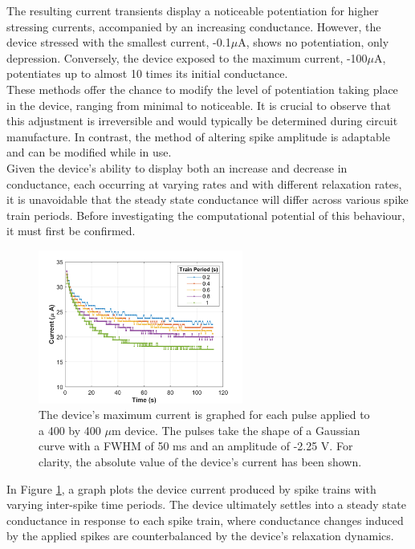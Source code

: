 \noindent The resulting current transients display a noticeable potentiation for higher stressing currents, accompanied by an increasing conductance. However, the device stressed with the smallest current, -0.1$\mu$A, shows no potentiation, only depression. Conversely, the device exposed to the maximum current, -100$\mu$A, potentiates up to almost 10 times its initial conductance.\\

\noindent These methods offer the chance to modify the level of potentiation taking place in the device, ranging from minimal to noticeable. It is crucial to observe that this adjustment is irreversible and would typically be determined during circuit manufacture. In contrast, the method of altering spike amplitude is adaptable and can be modified while in use.\\

\noindent Given the device's ability to display both an increase and decrease in conductance, each occurring at varying rates and with different relaxation rates, it is unavoidable that the steady state conductance will differ across various spike train periods. Before investigating the computational potential of this behaviour, it must first be confirmed.\\


\begin{figure}[htbp!] 
    \centering    
    \includegraphics[width=0.6\textwidth]{Chapter4/Figs/k.png}
    \caption[Device suitable for trains of voltage spikes with varying inter-spike time periods.]{The device's maximum current is graphed for each pulse applied to a 400 by 400 $\mu$m device. The pulses take the shape of a Gaussian curve with a FWHM of 50 ms and an amplitude of -2.25 V. For clarity, the absolute value of the device's current has been shown.}
    \label{fig:4k}
    \end{figure}
    
\noindent In Figure \ref{fig:4k}, a graph plots the device current produced by spike trains with varying inter-spike time periods. The device ultimately settles into a steady state conductance in response to each spike train, where conductance changes induced by the applied spikes are counterbalanced by the device's relaxation dynamics. \\

